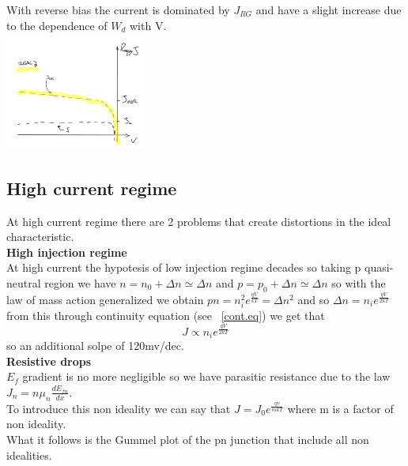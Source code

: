 \centering
{}
\raggedright

With reverse bias the current is dominated by $J_{RG}$ and have a slight increase due to the dependence of $W_d$ with V.\\

\centering
\includegraphics[width=0.35\textwidth]{inverselow.png}\\
\raggedright

\subsection{High current regime}
At high current regime there are 2 problems that create distortions in the ideal characteristic.\\
\vspace{5mm}
{\bf High injection regime}\\
At high current the hypotesis of low injection regime decades so taking p quasi-neutral region we have $n=n_0+\Delta n\simeq\Delta n$ and $p=p_0+\Delta n\simeq \Delta n$ so with the law of mass action generalized we obtain $pn=n_i^2e^{\frac{qV}{kT}}=\Delta n^2$ and so $\Delta n=n_ie^{\frac{qV}{2kT}}$ from this through continuity equation (see ~\ref{cont.eq}) we get that 
\begin{equation}
J\propto n_ie^{\frac{qV}{2kT}}
\end{equation}
so an additional solpe of 120mv/dec.\\ 
\vspace{5mm}
{\bf Resistive drops}\\
$E_f$ gradient is no more negligible so we have parasitic resistance due to the law $J_n=n\mu_n \frac{dE_{fn}}{dx}$.\\
To introduce this non ideality we can say that $J=J_0e^{\frac{qv}{mkT}}$ where m is a factor of non ideality.\\
What it follows is the Gummel plot of the pn junction that include all non idealities.\\

